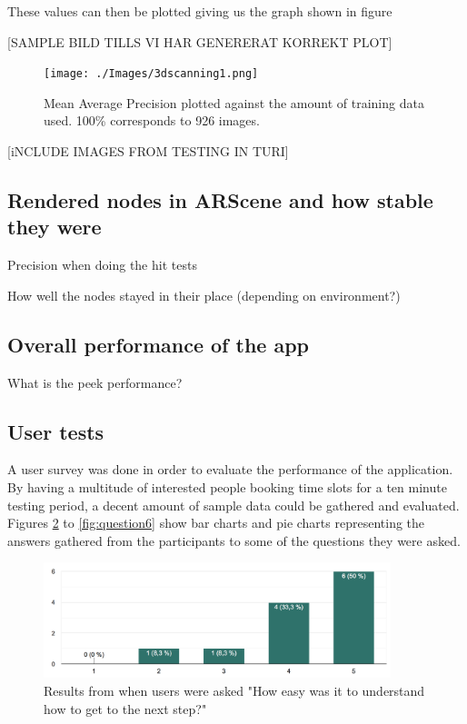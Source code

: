 These values can then be plotted giving us the graph shown in figure

[SAMPLE BILD TILLS VI HAR GENERERAT KORREKT PLOT]
\begin{figure}[hbtp]
\begin{center}
\texttt{[image: ./Images/3dscanning1.png]}
\caption{Mean Average Precision plotted against the amount of training data used. 100\% corresponds to 926 images.}
\label{fig:mAP}
\end{center}
\end{figure}

[iNCLUDE IMAGES FROM TESTING  IN TURI]

\subsection{Rendered nodes in ARScene and how stable they were}
Precision when doing the hit tests

How well the nodes stayed in their place (depending on environment?)

\subsection{Overall performance of the app}

What is the peek performance?

\subsection{User tests}

A user survey was done in order to evaluate the performance of the application. By having a multitude of interested people booking time slots for a ten minute testing period, a decent amount of sample data could be gathered and evaluated. Figures \ref{fig:question1} to \ref{fig:question6} show bar charts and pie charts representing the answers gathered from the participants to some of the questions they were asked. 

\begin{figure}[hbtp]
\begin{center}
\includegraphics[width = 0.9\textwidth]{./Images/easyToGetToNext.png}
\caption{Results from when users were asked "How easy was it to understand how to get to the next step?"}
\label{fig:question1}
\end{center}
\end{figure}

